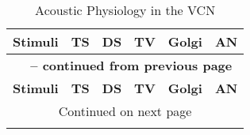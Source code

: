 \begin{longtable}{XXXXXX}
\caption{Acoustic Physiology in the VCN}\label{tab:Physiology} \\
\toprule  {\textbf{Stimuli}} & \textbf{TS} & \textbf{DS} & \textbf{TV} & \textbf{Golgi} & \textbf{AN}\\ \midrule 
\endfirsthead

\multicolumn{6}{c}{{\bfseries \tablename\ \thetable{} -- continued from previous page}} \\
\midrule  {\textbf{Stimuli}} & \textbf{TS} & \textbf{DS} & \textbf{TV} & \textbf{Golgi} & \textbf{AN}\\ \midrule 
\endhead

\midrule \multicolumn{6}{c}{{Continued on next page}} \\ %
\endfoot
\bottomrule
\endlastfoot


\end{longtable}
